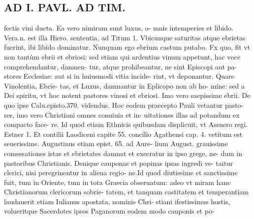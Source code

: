 \documentclass{article}
\begin{document}
\begin{pages}
\section*{AD I. PAVL. AD TIM. }
\marginpar{[ p.132 ]}\pstart fectis vini ducta. Ea vero nimirum sunt luxus, o- mnis intemperies et libido. Vera.n. est illa Hiero. sententia, ad Titum 1. Vbicunque saturitas atque ebrietas fuerint, ibi libido dominatur. Nunquam ego ebrium castum putabo. Fx quo, fit vt non tantùm ebrii et ebriosi: sed etiam qui ardentius vinum appetunt, hac voce comprehendantur, damnen- tur, atque prohibeantur, ne sint Episcopi aut pa- stores Ecclesiae: aut si in huiusmodi vitia incide- rint, vt deponantur. Quare Vinolentia, Ebrie- tas, et Luxus, damnantur in Eplicopo non ab ho- mine: sed a Dei spiritu, vt hoc notent pastores vinosi et ebriosi. Imo vero saepissime ebrii. De quo ipse Calu.episto.370. videndus.  \pend\pstart Hoc eodem praecepto Pauli vetantur pasto- res, imo vero Christiani omnes conuiuia et in- uitationes illas ad potandum ex compacto face- re. Id quod etiam Ethnicis quibusdam displicuit, vt Assuero regi. Estner 1. Et contilii Laodiceni capite 55. concilio Agathensi cap. 4. vetitum est seuerissime. Augustinus etiam epist. 65. ad Aure- lium August. grauissime comessationes istas et ebrietates damnat et execratur in ipso grege, ne- dum in pastoribus Christianis.  \pend\pstart Denique  cauponas et popinas ipsas ingredi ve- taitur clerici, nisi peregrinentur in aliena regio- ne.Id quod diutissime et sanctissime fuit, tum in Oriente, tum in tota Graecia obseruatum: adeo vt miram hanc Christianorum clericorum sobrie- tatem, et tanquam castitatem et temperantiam laudauerit etiam Iulianus apostata, nominis Chri- stiani ifestissimus hostis, volueritque  Sacerdotes ipsos Paganorum eodem modo cauponis et po-  \pend

\end{pages}
\end{document}
